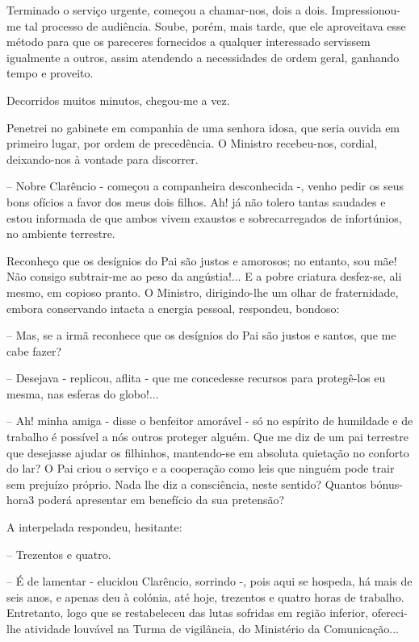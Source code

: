 \documentclass[portuguese,12pt,a4paper]{scrbook}
\begin{document}
	Terminado o serviço urgente, começou a chamar-nos, dois a dois. Impressionou-me tal processo de audiência. Soube, porém, mais tarde, que ele aproveitava esse método para que os pareceres fornecidos a qualquer interessado servissem igualmente a outros, assim atendendo a necessidades de ordem geral, ganhando tempo e proveito.
	
	Decorridos muitos minutos, chegou-me a vez.
	
	Penetrei no gabinete em companhia de uma senhora idosa, que seria ouvida em primeiro lugar, por ordem de precedência. O Ministro recebeu-nos, cordial, deixando-nos à vontade para discorrer.
	
	– Nobre Clarêncio - começou a companheira desconhecida -, venho pedir os seus bons ofícios a favor dos meus dois filhos. Ah! já não tolero tantas saudades e estou informada de que ambos vivem exaustos e sobrecarregados de infortúnios, no ambiente terrestre.
	
	
	Reconheço que os desígnios do Pai são justos e amorosos; no entanto, sou mãe! Não consigo subtrair-me ao peso da angústia!... E a pobre criatura desfez-se, ali mesmo, em copioso pranto. O Ministro, dirigindo-lhe um olhar de fraternidade, embora conservando intacta a energia pessoal, respondeu, bondoso:
	
	– Mas, se a irmã reconhece que os desígnios do Pai são justos e santos, que me cabe fazer?
	
	– Desejava - replicou, aflita - que me concedesse recursos para protegê-los eu mesma, nas esferas do globo!...
	
	– Ah! minha amiga - disse o benfeitor amorável - só no espírito de humildade e de trabalho é possível a nós outros proteger alguém. Que me diz de um pai terrestre que desejasse ajudar os filhinhos, mantendo-se em absoluta quietação no conforto do lar? O Pai criou o serviço e a cooperação como leis que ninguém pode trair sem prejuízo próprio. Nada lhe diz a consciência, neste sentido? Quantos bónus-hora3 poderá apresentar em benefício da sua pretensão?
	
	A interpelada respondeu, hesitante:
	
	– Trezentos e quatro.
	
	– É de lamentar - elucidou Clarêncio, sorrindo -, pois aqui se hospeda, há mais de seis anos, e apenas deu à colónia, até hoje, trezentos e quatro horas de trabalho. Entretanto, logo que se restabeleceu das lutas sofridas em região inferior, ofereci-lhe atividade louvável na Turma de vigilância, do Ministério da Comunicação...
	
\end{document}
